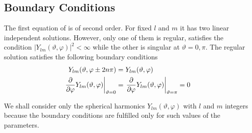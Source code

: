 \subsection{Boundary Conditions}
\par{The first equation of  is of second order. For fixed $l$ and $m$
it has two linear independent solutions. However, only one of them is regular,
satisfies the condition $|Y_{lm}(\vartheta,\varphi)|^2<\infty$ while the
other is singular at $\vartheta=0,\pi$. The regular solution satisfies the
following boundary conditions}
\begin{equation}
\label{boundary}
\begin{split}
Y_{lm}(\vartheta,\varphi \pm 2n\pi )&=Y_{lm}(\vartheta,\varphi)\\
\left.\frac{\partial }{\partial \varphi}Y_{lm}(\vartheta,\varphi)\right|_{\vartheta=0}&=\left.\frac{\partial }{\partial \varphi}Y_{lm}(\vartheta,\varphi)\right|_{\vartheta=\pi}=0
\end{split}
\end{equation}
\par{We shall consider only the spherical harmonics $Y_{lm}(\vartheta,\varphi)$
with $l$ and $m$ integers because the boundary conditions  are
fulfilled only for such values of the parameters.}
